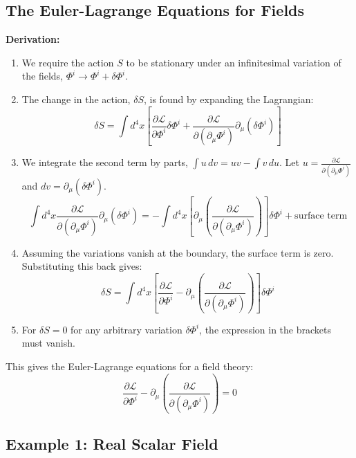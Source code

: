 \documentclass[11pt, a4paper]{report}
\begin{document}
\subsection*{The Euler-Lagrange Equations for Fields}

\textbf{Derivation:}
\begin{enumerate}
    \item We require the action $S$ to be stationary under an infinitesimal variation of the fields, $\Phi^i \to \Phi^i + \delta\Phi^i$.
    \item The change in the action, $\delta S$, is found by expanding the Lagrangian:
    \[
        \delta S = \int d^4x \left[ \frac{\partial\mathcal{L}}{\partial\Phi^i}\delta\Phi^i + \frac{\partial\mathcal{L}}{\partial(\partial_\mu\Phi^i)}\partial_\mu(\delta\Phi^i) \right]
    \]
    \item We integrate the second term by parts, $\int u \, dv = uv - \int v \, du$. Let $u = \frac{\partial\mathcal{L}}{\partial(\partial_\mu\Phi^i)}$ and $dv = \partial_\mu(\delta\Phi^i)$.
    \[
        \int d^4x \frac{\partial\mathcal{L}}{\partial(\partial_\mu\Phi^i)}\partial_\mu(\delta\Phi^i) = - \int d^4x \left[\partial_\mu\left(\frac{\partial\mathcal{L}}{\partial(\partial_\mu\Phi^i)}\right)\right] \delta\Phi^i + \text{surface term}
    \]
    \item Assuming the variations vanish at the boundary, the surface term is zero. Substituting this back gives:
    \[
        \delta S = \int d^4x \left[ \frac{\partial\mathcal{L}}{\partial\Phi^i} - \partial_\mu\left(\frac{\partial\mathcal{L}}{\partial(\partial_\mu\Phi^i)}\right) \right] \delta\Phi^i
    \]
    \item For $\delta S = 0$ for any arbitrary variation $\delta\Phi^i$, the expression in the brackets must vanish.
\end{enumerate}
This gives the Euler-Lagrange equations for a field theory:
\begin{equation}
    \frac{\partial\mathcal{L}}{\partial\Phi^i} - \partial_\mu\left(\frac{\partial\mathcal{L}}{\partial(\partial_\mu\Phi^i)}\right) = 0
\end{equation}

\subsection*{Example 1: Real Scalar Field}
\end{document}

